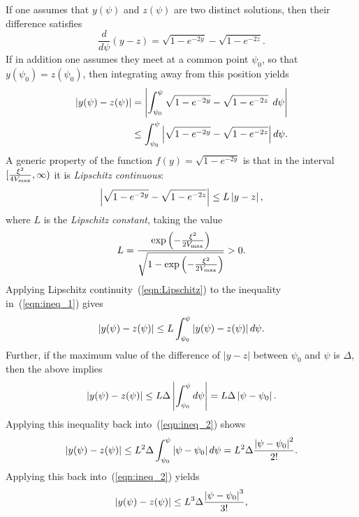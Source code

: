 If one assumes that $y(\psi)$ and $z(\psi)$ are two distinct solutions, then their difference satisfies
%
\begin{equation}
  \frac{d}{d\psi}(y-z)
  =
  \sqrt{1-e^{-2y}} - \sqrt{1-e^{-2z}}.
  \label{eqn:master_diff}
\end{equation}
%
If in addition one assumes they meet at a common point $\psi_0$, so that $y(\psi_0)=z(\psi_0)$, then integrating away from this position yields
%
\begin{align}
  \left|y(\psi)-z(\psi)\right|
  &=
  \left|\int_{\psi_0}^\psi \sqrt{1-e^{-2y}}
  - \sqrt{1-e^{-2z}}\:\:d\psi\right|
  \nonumber\\
  &
  \le \int_{\psi_0}^\psi \left|\sqrt{1-e^{-2y}}
  - \sqrt{1-e^{-2z}}\right|d\psi.
  \label{eqn:ineq_1}
\end{align}
%
A generic property of the function $f(y)=\sqrt{1-e^{-2y}}$ is that in the interval $[\frac{\xi^2}{4V_\mathrm{max}},\infty)$ it is {\em Lipschitz continuous}\/:
%
\begin{equation}
  \left|\sqrt{1-e^{-2y}} - \sqrt{1-e^{-2z}}\right| \le L\left|y-z\right|,
  \label{eqn:Lipschitz}
\end{equation}
%
where $L$ is the {\em Lipschitz constant}, taking the value
%
\begin{equation}
  L
  = 
  \frac{\exp{\left(-\frac{\xi^2}{2V_\mathrm{max}}\right)}}
  {\sqrt{1-\exp{\left(-\frac{\xi^2}{2V_\mathrm{max}}\right)}}} 
  > 0.
\end{equation}
%                                              
Applying Lipschitz continuity~(\ref{eqn:Lipschitz}) to the inequality in~(\ref{eqn:ineq_1}) gives    
%
\begin{equation}
  \left|y(\psi)-z(\psi)\right| 
  \le
  L\int_{\psi_0}^\psi\left|y(\psi)-z(\psi)\right|d\psi.
  \label{eqn:ineq_2}
\end{equation}
%
Further, if the maximum value of the difference of $|y-z|$ between $\psi_0$ and $\psi$ is $\Delta$, then the above implies
%
\begin{equation}
  \left|y(\psi)-z(\psi)\right| 
  \le
  L\Delta\left|\int_{\psi_0}^\psi d\psi\right|= 
  L\Delta\left|\psi-\psi_0\right|.
\end{equation}
%
Applying this inequality back into~(\ref{eqn:ineq_2}) shows
%
\begin{equation}
  \left|y(\psi)-z(\psi)\right| 
  \le
  L^2\Delta\int_{\psi_0}^\psi\left|\psi-\psi_0\right|d\psi =
  L^2\Delta\frac{\left|\psi-\psi_0\right|^2}{2!}.
\end{equation}
%
Applying this back into~(\ref{eqn:ineq_2}) yields
%
\begin{equation}
  \left|y(\psi)-z(\psi)\right| 
  \le
  L^3\Delta\frac{\left|\psi-\psi_0\right|^3}{3!},
\end{equation}

